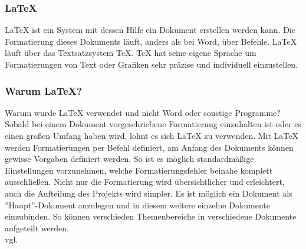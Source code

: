 \subsubsection {LaTeX}
\label{sec:LaTeX}
LaTeX ist ein System mit dessen Hilfe ein Dokument erstellen werden kann. Die Formatierung dieses Dokuments läuft, anders als bei Word, über Befehle. LaTeX läuft über das Textsatzsystem TeX. TeX hat seine eigene Sprache um Formatierungen von Text oder Grafiken sehr präzise und individuell einzustellen. 
\subsubsection{Warum LaTeX?} 
\label{sec:WarumLaTeX}
Warum wurde LaTeX verwendet und nicht Word oder sonstige Programme? Sobald bei einem Dokument vorgeschriebene Formatierung einzuhalten ist oder es einen großen Umfang haben wird, lohnt es sich LaTeX zu verwenden. Mit LaTeX werden Formatierungen per Befehl definiert, am Anfang des Dokuments können gewisse Vorgaben definiert werden. So ist es möglich standardmäßige Einstellungen vorzunehmen, welche Formatierungsfehler beinahe komplett ausschließen. Nicht nur die Formatierung wird übersichtlicher und erleichtert, auch die Aufteilung des Projekts wird simpler. Es ist möglich ein Dokument als ''Haupt''-Dokument anzulegen und in diesem weitere einzelne Dokumente einzubinden. So können verschieden Themenbereiche in verschiedene Dokumente aufgeteilt werden. \\vgl. \textcite{TechnologieLaTeX} 
